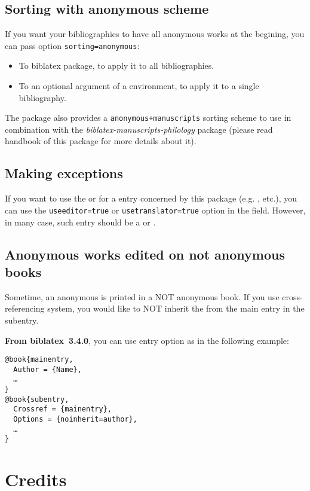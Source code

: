 \documentclass{ltxdockit}[2011/03/25]
\newcommand{\biblatex}{biblatex\xspace}
\begin{document}
\subsection{Sorting with anonymous scheme}

If you want your bibliographies to have all anonymous works at the begining, you can pass option \verb+sorting=anonymous+:

\begin{itemize}
	\item To \biblatex package, to apply it to all bibliographies.
	\item To an optional argument of a  environment, to apply it to a single bibliography.
\end{itemize}

The package also provides a \verb-anonymous+manuscripts- sorting scheme to use in combination with the \emph{biblatex-manuscripts-philology} package (please read handbook of this package for more details about it).
\subsection{Making exceptions}

If you want to use the  or  for a entry concerned by this package (e.g. ,  etc.), you can use the \verb+useeditor=true+ or \verb+usetranslator=true+ 
option in the  field. However, in many case, such entry should be a  or . 

\subsection{Anonymous works edited on not anonymous books}\label{noinherit}

Sometime, an anonymous  is printed in a NOT anonymous book.
If you use cross-referencing system, you would like to NOT inherit the  from the main entry in the subentry.

\textbf{From \biblatex~3.4.0}, you can use entry option  as in the following example:

\begin{verbatim}
@book{mainentry,
  Author = {Name},
  …
}
@book{subentry,
  Crossref = {mainentry},
  Options = {noinherit=author},
  …
}
\end{verbatim}
\section{Credits}
\end{document}
